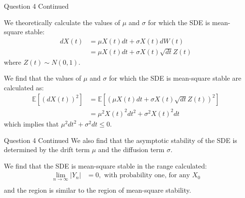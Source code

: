 \documentclass[compress,12pt]{beamer}
\begin{document}
\begin{frame}{Question 4 Continued}

      We theoretically calculate the values of $\mu$ and $\sigma$ for which the SDE is mean-square stable:
      \begin{align*}
            dX(t) &= \mu X(t) dt + \sigma X(t) dW(t) \\
            &= \mu X(t) dt + \sigma X(t) \sqrt{dt} Z(t)
      \end{align*}
      where $Z(t) \sim N(0,1)$.

      We find that the values of $\mu$ and $\sigma$ for which the SDE is mean-square stable are calculated as:
      \begin{align*}
            \mathbb{E}[(dX(t))^2] &= \mathbb{E}[(\mu X(t) dt + \sigma X(t) \sqrt{dt} Z(t))^2] \\
            &= \mu^2 X(t)^2 dt^2 + \sigma^2 X(t)^2 dt
      \end{align*}
      which implies that $\mu^2 dt^2 + \sigma^2 dt \leq 0$.
\end{frame}



\begin{frame}{Question 4 Continued}
      We also find that the asymptotic stability of the SDE is determined by the drift term $\mu$ and the diffusion term $\sigma$.

      We find that the SDE is mean-square stable in the range calculated:
      \begin{align*}
            \lim_{n \to \infty} |Y_n| &= 0, \text{ with probability one, for any } X_0 \\
      \end{align*}
      and the region is similar to the region of mean-square stability.
\end{frame}
\end{document}
